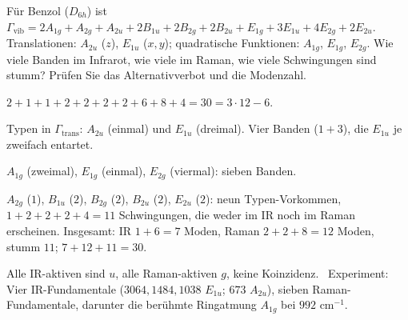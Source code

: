 \begin{aufgabe}
Für Benzol ($D_{6h}$) ist $\Gamma_{\mathrm{vib}} = 2A_{1g} + A_{2g} + A_{2u} + 2B_{1u} + 2B_{2g} + 2B_{2u} + E_{1g} + 3E_{1u} + 4E_{2g} + 2E_{2u}$. Translationen: $A_{2u}$ ($z$), $E_{1u}$ ($x, y$); quadratische Funktionen: $A_{1g}$, $E_{1g}$, $E_{2g}$. Wie viele Banden im Infrarot, wie viele im Raman, wie viele Schwingungen sind stumm? Prüfen Sie das Alternativverbot und die Modenzahl.

\loesung
{}
$2 + 1 + 1 + 2 + 2 + 2 + 2 + 6 + 8 + 4 = 30 = 3\cdot12 - 6$. \checkmark

Typen in $\Gamma_{\mathrm{trans}}$: $A_{2u}$ (einmal) und $E_{1u}$ (dreimal). Vier Banden ($1 + 3$), die $E_{1u}$ je zweifach entartet.

$A_{1g}$ (zweimal), $E_{1g}$ (einmal), $E_{2g}$ (viermal): sieben Banden.

$A_{2g}$ ($1$), $B_{1u}$ ($2$), $B_{2g}$ ($2$), $B_{2u}$ ($2$), $E_{2u}$ ($2$): neun Typen-Vorkommen, $1 + 2 + 2 + 2 + 4 = 11$ Schwingungen, die weder im IR noch im Raman erscheinen. Insgesamt: IR $1 + 6 = 7$ Moden, Raman $2 + 2 + 8 = 12$ Moden, stumm $11$; $7 + 12 + 11 = 30$. \checkmark

Alle IR-aktiven sind $u$, alle Raman-aktiven $g$, keine Koinzidenz. \checkmark\ Experiment: Vier IR-Fundamentale ($3064, 1484, 1038$ $E_{1u}$; $673$ $A_{2u}$), sieben Raman-Fundamentale, darunter die berühmte Ringatmung $A_{1g}$ bei $992$ cm$^{-1}$.

\begin{center}
\begin{minipage}{0.88\textwidth}
\end{minipage}
\end{center}
\end{aufgabe}

